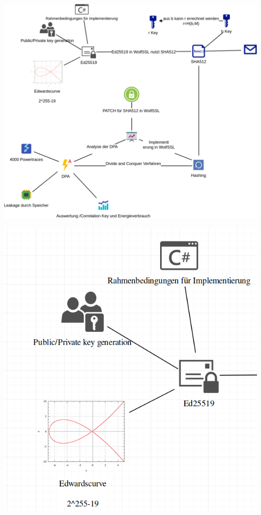 \documentclass[
  10pt,
  ignorenonframetext,
  aspectratio=43,
]{beamer}
\begin{document}
\begin{frame}{}
\protect\hypertarget{section}{}
\includegraphics{Abbildungen/ITSEC(1)_res.png}
\end{frame}

\begin{frame}{}
\protect\hypertarget{section-1}{}
\includegraphics{Abbildungen/Punkt1.png}
\end{frame}
\end{document}
